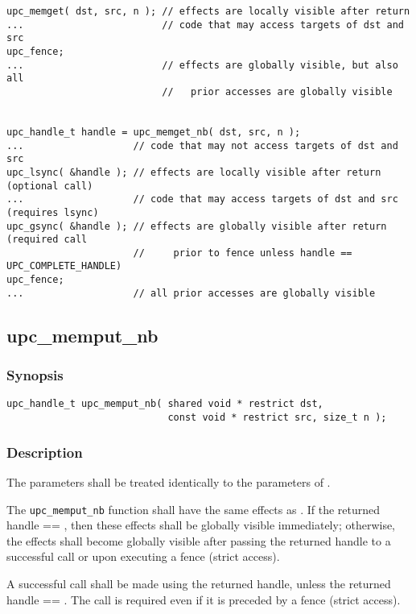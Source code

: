 \begin{verbatim}
upc_memget( dst, src, n ); // effects are locally visible after return
...                        // code that may access targets of dst and src
upc_fence;                 
...                        // effects are globally visible, but also all
                           //   prior accesses are globally visible


upc_handle_t handle = upc_memget_nb( dst, src, n );
...                   // code that may not access targets of dst and src
upc_lsync( &handle ); // effects are locally visible after return (optional call)
...                   // code that may access targets of dst and src (requires lsync)
upc_gsync( &handle ); // effects are globally visible after return (required call
                      //     prior to fence unless handle == UPC_COMPLETE_HANDLE)
upc_fence;
...                   // all prior accesses are globally visible
\end{verbatim}

\newpage
\subsection{upc\_memput\_nb}
\def\function{{\tt upc\_memput\_nb}}

\subsubsection{Synopsis}

\begin{verbatim}
upc_handle_t upc_memput_nb( shared void * restrict dst,
                            const void * restrict src, size_t n );
\end{verbatim}

\subsubsection{Description}

\npf The parameters shall be treated identically to the parameters of
\memput{}.

\np The \function{} function shall have the same effects as \memput{}.
If the returned handle == \complete{}, then these effects shall be globally
visible immediately; otherwise, the effects shall become globally visible after
passing the returned handle to a successful \gsync{} call or upon executing a
fence (strict access).

\np A successful \gsync{} call shall be made using the returned handle,
unless the returned handle == \complete{}.  The call is required even if it is
preceded by a fence (strict access).

